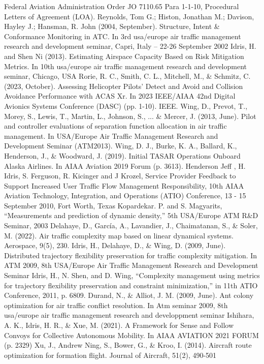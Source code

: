 \documentclass[conference, letter]{IEEEtran}
\begin{document}
\begin{thebibliography}{00}
 Federal Aviation Administration Order JO 7110.65 Para 1-1-10, Procedural Letters of Agreement (LOA).
 Reynolds, Tom G.; Histon, Jonathan M.; Davison, Hayley J.; Hansman, R. John (2004, September). Structure, Intent \& Conformance Monitoring in ATC. In 3rd usa/europe air traffic management research and development seminar, Capri, Italy – 22-26 September 2002
Idris, H. and Shen Ni (2013). Estimating Airspace Capacity Based on Risk
Mitigation Metrics. In 10th usa/europe air traffic management research and development seminar, Chicago, USA
 Rorie, R. C., Smith, C. L., Mitchell, M., \& Schmitz, C. (2023, October). Assessing Helicopter Pilots’ Detect and Avoid and Collision Avoidance Performance with ACAS Xr. In 2023 IEEE/AIAA 42nd Digital Avionics Systems Conference (DASC) (pp. 1-10). IEEE.
 Wing, D., Prevot, T., Morey, S., Lewis, T., Martin, L., Johnson, S., ... \& Mercer, J. (2013, June). Pilot and controller evaluations of separation function allocation in air traffic management. In USA/Europe Air Traffic Management Research and Development Seminar (ATM2013).
 Wing, D. J., Burke, K. A., Ballard, K., Henderson, J., \& Woodward, J. (2019). Initial TASAR Operations Onboard Alaska Airlines. In AIAA Aviation 2019 Forum (p. 3613).
 Henderson Jeff , H. Idris, S. Ferguson, R. Kicinger and J Krozel, Service Provider Feedback to Support Increased User Traffic Flow Management Responsibility, 10th AIAA Aviation Technology, Integration, and Operations (ATIO) Conference, 13 - 15 September 2010, Fort Worth, Texas 
 Kopardekar. P. and S. Magyarits, “Measurements and prediction of dynamic density,” 5th USA/Europe ATM R\&D Seminar, 2003
 Delahaye, D., García, A., Lavandier, J., Chaimatanan, S., \& Soler, M. (2022). Air traffic complexity map based on linear dynamical systems. Aerospace, 9(5), 230.
 Idris, H., Delahaye, D., \& Wing, D. (2009, June). Distributed trajectory flexibility preservation for traffic complexity mitigation. In ATM 2009, 8th USA/Europe Air Traffic Management Research and Development Seminar
 Idris, H.,  N. Shen, and D. Wing, “Complexity management using metrics for trajectory flexibility preservation and constraint
minimization,” in 11th ATIO Conference, 2011, p. 6809.
 Durand, N., \& Alliot, J. M. (2009, June). Ant colony optimization for air traffic conflict resolution. In Atm seminar 2009, 8th usa/europe air traffic management research and developpment seminar
 Ishihara, A. K., Idris, H. R., \& Xue, M. (2021). A Framework for Sense and Follow Convoys for Collective Autonomous Mobility. In AIAA AVIATION 2021 FORUM (p. 2329)
 Xu, J., Andrew Ning, S., Bower, G., \& Kroo, I. (2014). Aircraft route optimization for formation flight. Journal of Aircraft, 51(2), 490-501


\end{thebibliography}
\end{document}
